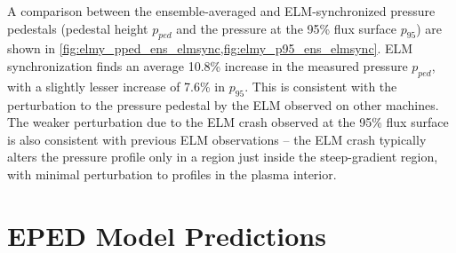 \begin{figure}[h]
 \pushtooutside
\end{figure}

A comparison between the ensemble-averaged and ELM-synchronized pressure pedestals (pedestal height $p_{ped}$ and the pressure at the 95\% flux surface $p_{95}$) are shown in \cref{fig:elmy_pped_ens_elmsync,fig:elmy_p95_ens_elmsync}.  ELM synchronization finds an average 10.8\% increase in the measured pressure $p_{ped}$, with a slightly lesser increase of 7.6\% in $p_{95}$.  This is consistent with the perturbation to the pressure pedestal by the ELM observed on other machines.  The weaker perturbation due to the ELM crash observed at the 95\% flux surface is also consistent with previous ELM observations -- the ELM crash typically alters the pressure profile only in a region just inside the steep-gradient region, with minimal perturbation to profiles in the plasma interior.\nicesectionending

\section{EPED Model Predictions}\label{sec:elmy_eped}

